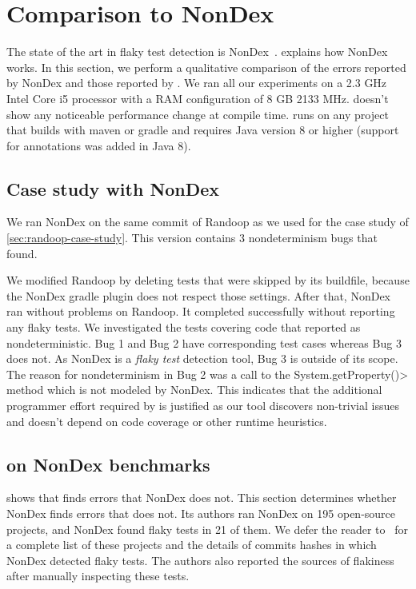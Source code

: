 \section{Comparison to NonDex}

The state of the art in flaky test detection is NonDex~\cite{nondex}.
 explains how NonDex works. In this section, we perform a qualitative comparison of the
errors reported by NonDex and those reported by \TheDeterminismChecker. We ran all our
experiments on a 2.3 GHz Intel Core i5 processor with a RAM configuration of 8 GB 2133 MHz.
\TheDeterminismChecker doesn't show any noticeable performance change at compile time.
\TheDeterminismChecker runs on any project that builds with maven or gradle and requires
Java version 8 or higher (support for annotations was added in Java 8).

\subsection{Case study with NonDex}\label{sec:nondex-randoop}

We ran NonDex on the same commit of Randoop as we used for the case study
of \cref{sec:randoop-case-study}.  This version contains 3 nondeterminism bugs that
\theDeterminismChecker found.

We modified Randoop by deleting tests that were skipped by its buildfile,
because the NonDex gradle plugin does not respect those settings. 
After that, NonDex ran without problems on Randoop.
It completed successfully without reporting any flaky tests.
We investigated the tests covering code that \theDeterminismChecker reported as nondeterministic.
Bug 1 and Bug 2 have corresponding test cases whereas Bug 3 does not.
As NonDex is a \textit{flaky test} detection tool, Bug 3 is outside of its scope.
The reason for nondeterminism in Bug 2 was a call to the \<System.getProperty()> method which
is not modeled by NonDex.
This indicates that the additional programmer effort required by \TheDeterminismChecker is justified
as our tool discovers non-trivial issues and doesn't depend on code coverage or other runtime heuristics.

\subsection{\TheDeterminismChecker on NonDex benchmarks}\label{sec:nondex-benchmarks}

 shows that \theDeterminismChecker finds errors that NonDex does not.
This section determines whether NonDex finds errors that \theDeterminismChecker does not.
Its authors ran NonDex on 195 open-source projects, and NonDex found flaky tests in
21 of them. We defer the reader to~\cite{nondex} for a complete list of these projects
and the details of commits hashes in which NonDex detected flaky tests.
The authors also reported the sources of flakiness
after manually inspecting these tests. 

